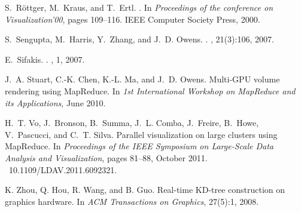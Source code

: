 \documentclass[10pt,journal,cspaper,compsoc]{IEEEtran}
\begin{document}
\begin{thebibliography}{10}
S.~R\"{o}ttger, M.~Kraus, and T.~Ertl.
.
\newblock In {\em Proceedings of the conference on Visualization'00}, pages
  109--116. IEEE Computer Society Press, 2000.

S.~Sengupta, M.~Harris, Y.~Zhang, and J.~D. Owens.
.
, 21(3):106, 2007.

E.~Sifakis.
.
, 1, 2007.

J.~A. Stuart, C.-K. Chen, K.-L. Ma, and J.~D. Owens.
\newblock Multi-{GPU} volume rendering using {MapReduce}.
\newblock In {\em 1st International Workshop on MapReduce and its
  Applications}, June 2010.

H.~T. Vo, J.~Bronson, B.~Summa, J.~L. Comba, J.~Freire, B.~Howe, V.~Pascucci,
  and C.~T. Silva.
\newblock Parallel visualization on large clusters using {MapReduce}.
\newblock In {\em Proceedings of the IEEE Symposium on Large-Scale Data
  Analysis and Visualization}, pages 81--88, October 2011.
~10.1109/LDAV.2011.6092321.

K. Zhou, Q. Hou, R. Wang, and B. Guo.
\newblock Real-time KD-tree construction on graphics hardware.
\newblock In {\em ACM Transactions on Graphics}, 27(5):1, 2008.

\end{thebibliography}

%




\end{document}
